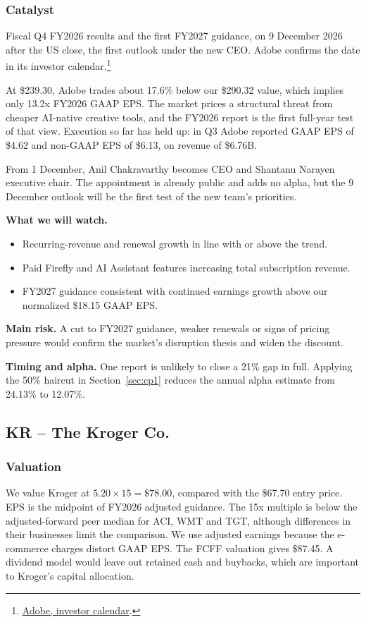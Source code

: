 \documentclass[10pt,a4paper]{article}
\begin{document}
\subsubsection*{Catalyst}
Fiscal Q4 FY2026 results and the first FY2027 guidance, on 9 December 2026 after the US close, the first outlook under the new CEO. Adobe confirms the date in its investor calendar.\footnote{\href{https://www.adobe.com/investor-relations/calendar.html}{Adobe, investor calendar}.}

At \$239.30, Adobe trades about 17.6\% below our \$290.32 value, which implies only 13.2x FY2026 GAAP EPS. The market prices a structural threat from cheaper AI-native creative tools, and the FY2026 report is the first full-year test of that view. Execution so far has held up: in Q3 Adobe reported GAAP EPS of \$4.62 and non-GAAP EPS of \$6.13, on revenue of \$6.76B.

From 1 December, Anil Chakravarthy becomes CEO and Shantanu Narayen executive chair. The appointment is already public and adds no alpha, but the 9 December outlook will be the first test of the new team's priorities.

\textbf{What we will watch.}
\begin{itemize}[leftmargin=1.2em,itemsep=2pt,topsep=2pt]
  \item Recurring-revenue and renewal growth in line with or above the trend.
  \item Paid Firefly and AI Assistant features increasing total subscription revenue.
  \item FY2027 guidance consistent with continued earnings growth above our normalized \$18.15 GAAP EPS.
\end{itemize}

\textbf{Main risk.} A cut to FY2027 guidance, weaker renewals or signs of pricing pressure would confirm the market's disruption thesis and widen the discount.

\textbf{Timing and alpha.} One report is unlikely to close a 21\% gap in full. Applying the 50\% haircut in Section~\ref{sec:cp1} reduces the annual alpha estimate from 24.13\% to 12.07\%.

\subsection{KR -- The Kroger Co.}

\subsubsection*{Valuation}
We value Kroger at $5.20\times15=\$78.00$, compared with the \$67.70 entry price. EPS is the midpoint of FY2026 adjusted guidance. The 15x multiple is below the adjusted-forward peer median for ACI, WMT and TGT, although differences in their businesses limit the comparison. We use adjusted earnings because the e-commerce charges distort GAAP EPS. The FCFF valuation gives \$87.45. A dividend model would leave out retained cash and buybacks, which are important to Kroger's capital allocation.
\end{document}
